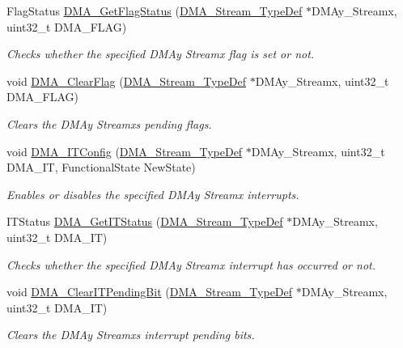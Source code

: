 \begin{DoxyCompactItemize}
Flag\+Status \hyperlink{group___d_m_a_ga10cfc0fe31d64a1fd8fb3efb4ae2a411}{D\+M\+A\+\_\+\+Get\+Flag\+Status} (\hyperlink{struct_d_m_a___stream___type_def}{D\+M\+A\+\_\+\+Stream\+\_\+\+Type\+Def} $\ast$D\+M\+Ay\+\_\+\+Streamx, uint32\+\_\+t D\+M\+A\+\_\+\+F\+L\+AG)
\begin{DoxyCompactList}\small\item\em Checks whether the specified D\+M\+Ay Streamx flag is set or not. \end{DoxyCompactList}\item 
void \hyperlink{group___d_m_a_ga510d62b4051f5a5de164e84b266b851d}{D\+M\+A\+\_\+\+Clear\+Flag} (\hyperlink{struct_d_m_a___stream___type_def}{D\+M\+A\+\_\+\+Stream\+\_\+\+Type\+Def} $\ast$D\+M\+Ay\+\_\+\+Streamx, uint32\+\_\+t D\+M\+A\+\_\+\+F\+L\+AG)
\begin{DoxyCompactList}\small\item\em Clears the D\+M\+Ay Streamx\textquotesingle{}s pending flags. \end{DoxyCompactList}\item 
void \hyperlink{group___d_m_a_gab9c469a3f5d4aca5c97dee798ffc2f05}{D\+M\+A\+\_\+\+I\+T\+Config} (\hyperlink{struct_d_m_a___stream___type_def}{D\+M\+A\+\_\+\+Stream\+\_\+\+Type\+Def} $\ast$D\+M\+Ay\+\_\+\+Streamx, uint32\+\_\+t D\+M\+A\+\_\+\+IT, Functional\+State New\+State)
\begin{DoxyCompactList}\small\item\em Enables or disables the specified D\+M\+Ay Streamx interrupts. \end{DoxyCompactList}\item 
I\+T\+Status \hyperlink{group___d_m_a_gad0ccf5f6548bd7cf8f2cae30393bb716}{D\+M\+A\+\_\+\+Get\+I\+T\+Status} (\hyperlink{struct_d_m_a___stream___type_def}{D\+M\+A\+\_\+\+Stream\+\_\+\+Type\+Def} $\ast$D\+M\+Ay\+\_\+\+Streamx, uint32\+\_\+t D\+M\+A\+\_\+\+IT)
\begin{DoxyCompactList}\small\item\em Checks whether the specified D\+M\+Ay Streamx interrupt has occurred or not. \end{DoxyCompactList}\item 
void \hyperlink{group___d_m_a_gad5433018889cd36140d98bb380c4e76e}{D\+M\+A\+\_\+\+Clear\+I\+T\+Pending\+Bit} (\hyperlink{struct_d_m_a___stream___type_def}{D\+M\+A\+\_\+\+Stream\+\_\+\+Type\+Def} $\ast$D\+M\+Ay\+\_\+\+Streamx, uint32\+\_\+t D\+M\+A\+\_\+\+IT)
\begin{DoxyCompactList}\small\item\em Clears the D\+M\+Ay Streamx\textquotesingle{}s interrupt pending bits. \end{DoxyCompactList}\end{DoxyCompactItemize}


